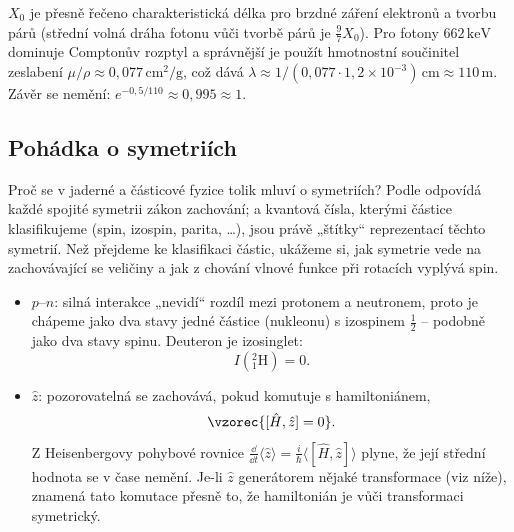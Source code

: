 \begin{vysvetleni}
\(X_0\) je přesně řečeno charakteristická délka pro brzdné záření elektronů
a tvorbu párů (střední volná dráha fotonu vůči tvorbě párů je
\(\tfrac97 X_0\)). Pro fotony \(662\,\text{keV}\) dominuje Comptonův rozptyl
a správnější je použít hmotnostní součinitel zeslabení
\(\mu/\rho \approx 0{,}077\,\text{cm}^2/\text{g}\), což dává
\(\lambda \approx 1/(0{,}077\cdot 1{,}2\times10^{-3})\,\text{cm} \approx 110\,\text{m}\).
Závěr se nemění: \(e^{-0{,}5/110} \approx 0{,}995 \approx 1\).
\end{vysvetleni}

\subsection{Pohádka o symetriích}

Proč se v jaderné a částicové fyzice tolik mluví o symetriích? Podle
 odpovídá každé spojité symetrii zákon zachování; a
kvantová čísla, kterými částice klasifikujeme (spin, izospin, parita, \dots),
jsou právě „štítky`` reprezentací těchto symetrií. Než přejdeme ke
klasifikaci částic, ukážeme si, jak symetrie vede na zachovávající se
veličiny a jak z chování vlnové funkce při rotacích vyplývá spin.

\begin{itemize}
  \item {} \(p\)–\(n\): silná interakce „nevidí`` rozdíl mezi
  protonem a neutronem, proto je chápeme jako dva stavy jedné částice
  (nukleonu) s izospinem \(\tfrac12\) – podobně jako dva stavy spinu.
  Deuteron je izosinglet:
  \[
    I({}^2_1\text{H}) = 0 .
  \]
  \item {} \(\hat z\): pozorovatelná se zachovává,
  pokud komutuje s hamiltoniánem,
  \[
    \vzorec{[\hat H, \hat z] = 0} .
  \]
  Z Heisenbergovy pohybové rovnice
  \(\frac{\dd}{\dd t}\langle \hat z\rangle = \frac{i}{\hbar}\langle[\hat H,\hat z]\rangle\)
  plyne, že její střední hodnota se v čase nemění. Je-li \(\hat z\)
  generátorem nějaké transformace (viz níže), znamená tato komutace přesně
  to, že hamiltonián je vůči transformaci symetrický.
\end{itemize}

